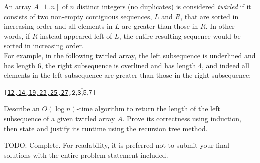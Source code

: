 \documentclass[11pt]{article}
\begin{document}
\pagebreak
\begin{question}
An array $A[1..n]$ of $n$ distinct integers (no duplicates) is considered \emph{twirled} if it consists of two non-empty contiguous sequences, $L$ and $R$, that are sorted in increasing order and all elements in $L$ are greater than those in $R$. In other words, if $R$ instead appeared left of $L$, the entire resulting sequence would be sorted in increasing order. \\

For example, in the following twirled array, the left subsequence is underlined and has length 6, the right subsequence is overlined and has length 4, and indeed all elements in the left subsequence are greater than those in the right subsequence:
\begin{center}
    \texttt{[\underline{12,14,19,23,25,27},$\overline{\texttt{2,3,5,7}}$]}
\end{center}

Describe an $O(\log n)$-time algorithm to return the length of the left subsequence of a given twirled array $A$. Prove its correctness using induction, then state and justify its runtime using the recursion tree method.\\

\end{question}

\begin{solution}
TODO: Complete. For readability, it is preferred not to submit your final solutions with the entire problem statement included.
\end{solution}
\end{document}
